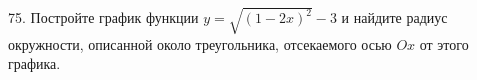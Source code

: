 75. Постройте график функции $y=\sqrt{(1-2x)^2}-3$ и найдите радиус окружности, описанной около треугольника, отсекаемого осью $Ox$ от этого графика.\\
